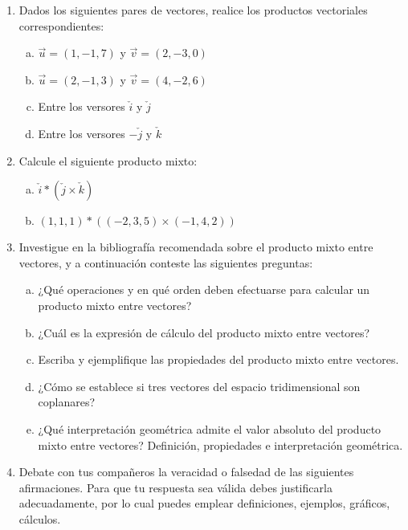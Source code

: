 \documentclass[11pt,a4paper]{article}
\begin{document}
\begin{enumerate}
\item Dados los siguientes pares de vectores, realice los productos vectoriales correspondientes:

\begin{enumerate}[a)]
\item $\vec{u} = (1, -1, 7)$ y $\vec{v} = (2, -3, 0)$
\item $\vec{u} = (2, -1, 3)$ y $\vec{v} = (4, -2, 6)$
\item Entre los versores $\check{i}$ y $\check{j}$
\item Entre los versores $-\check{j}$ y $\check{k}$
\end{enumerate}

\item Calcule el siguiente producto mixto:

\begin{enumerate}[a)]
\item $\check{i} * (\check{j} \times \check{k})$
\item $(1, 1, 1) * ((-2, 3, 5) \times (-1, 4, 2))$
\end{enumerate}

\item Investigue en la bibliograf\'ia recomendada sobre el producto mixto entre vectores, y a continuaci\'on conteste las siguientes preguntas:

\begin{enumerate}[a)]
\item ¿Qu\'e operaciones y en qu\'e orden deben efectuarse para calcular un producto mixto entre vectores?
\item ¿Cu\'al es la expresi\'on de c\'alculo del producto mixto entre vectores?
\item Escriba y ejemplifique las propiedades del producto mixto entre vectores.
\item ¿C\'omo se establece si tres vectores del espacio tridimensional son coplanares?
\item ¿Qu\'e interpretaci\'on geom\'etrica admite el valor absoluto del producto mixto entre vectores? Definici\'on, propiedades e interpretaci\'on geom\'etrica.
\end{enumerate}
 
\item Debate con tus compa\~neros la veracidad o falsedad de las siguientes afirmaciones. Para que tu respuesta sea v\'alida debes justificarla adecuadamente, por lo cual puedes emplear definiciones, ejemplos, gr\'aficos, c\'alculos.


\end{enumerate}
\end{document}

